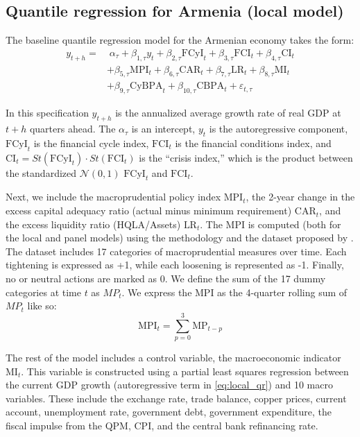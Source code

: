 \subsection{Quantile regression for Armenia (local model)}
The baseline quantile regression model for the Armenian economy takes the form:
\begin{equation}
    \label{eq:local_qr}
    \begin{aligned}
    y_{t+h} = 
    &\;\alpha_\tau + \beta_{1, \tau}y_t + \beta_{2, \tau}\text{FCyI}_t + \beta_{3, \tau}\text{FCI}_t + \beta_{4, \tau}\text{CI}_t \\
    &+ \beta_{5, \tau}\text{MPI}_t + \beta_{6, \tau}\text{CAR}_t + \beta_{7, \tau}\text{LR}_t + \beta_{8, \tau}\text{MI}_t \\
    &+ \beta_{9, \tau}\text{CyBPA}_t + \beta_{10, \tau}\text{CBPA}_t + \varepsilon_{t, \tau}
    \end{aligned}
\end{equation}

In this specification $y_{t+h}$ is the annualized average growth rate of real GDP at $t+h$ quarters ahead. The $\alpha_\tau$ is an intercept, $y_t$ is the autoregressive component, $\text{FCyI}_t$ is the financial cycle index, $\text{FCI}_t$ is the financial conditions index, and $\text{CI}_t = St(\text{FCyI}_t) \cdot St(\text{FCI}_t)$ is the “crisis index,” which is the product between the standardized $\mathcal{N}(0, 1)$ $\text{FCyI}_t$ and $\text{FCI}_t$.

Next, we include the macroprudential policy index $\text{MPI}_t$, the 2-year change in the excess capital adequacy ratio (actual minus minimum requirement) $\text{CAR}_t$, and the excess liquidity ratio (HQLA/Assets) $\text{LR}_t$. The MPI is computed (both for the local and panel models) using the methodology and the dataset proposed by \citet{alam2019}. The dataset includes 17 categories of macroprudential measures over time. Each tightening is expressed as +1, while each loosening is represented as -1. Finally, no or neutral actions are marked as 0. We define the sum of the 17 dummy categories at time $t$ as $MP_t$. We express the MPI as the 4-quarter rolling sum of $MP_t$ like so:
\begin{equation}
    \label{eq:local_mpi}
    \text{MPI}_t = \sum_{p=0}^{3} \text{MP}_{t-p}
\end{equation}

The rest of the model includes a control variable, the macroeconomic indicator $\text{MI}_t$. This variable is constructed using a partial least squares regression between the current GDP growth (autoregressive term in \autoref{eq:local_qr}) and 10 macro variables. These include the exchange rate, trade balance, copper prices, current account, unemployment rate, government debt, government expenditure, the fiscal impulse from the QPM, CPI, and the central bank refinancing rate.

